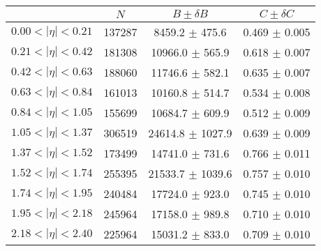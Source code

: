\begin{tabular}{lccc}
\hline
    &   $N$   & $B \pm \delta B$  &  $C \pm \delta C$ \\
\hline
$0.00 < |\eta| <0.21$          & 137287     & 8459.2     $\pm$ 475.6 & 0.469      $\pm$ 0.005 \\
$0.21 < |\eta| <0.42$          & 181308     & 10966.0    $\pm$ 565.9 & 0.618      $\pm$ 0.007 \\
$0.42 < |\eta| <0.63$          & 188060     & 11746.6    $\pm$ 582.1 & 0.635      $\pm$ 0.007 \\
$0.63 < |\eta| <0.84$          & 161013     & 10160.8    $\pm$ 514.7 & 0.534      $\pm$ 0.008 \\
$0.84 < |\eta| <1.05$          & 155699     & 10684.7    $\pm$ 609.9 & 0.512      $\pm$ 0.009 \\
$1.05 < |\eta| <1.37$          & 306519     & 24614.8    $\pm$ 1027.9 & 0.639      $\pm$ 0.009 \\
$1.37 < |\eta| <1.52$          & 173499     & 14741.0    $\pm$ 731.6 & 0.766      $\pm$ 0.011 \\
$1.52 < |\eta| <1.74$          & 255395     & 21533.7    $\pm$ 1039.6 & 0.757      $\pm$ 0.010 \\
$1.74 < |\eta| <1.95$          & 240484     & 17724.0    $\pm$ 923.0 & 0.745      $\pm$ 0.010 \\
$1.95 < |\eta| <2.18$          & 245964     & 17158.0    $\pm$ 989.8 & 0.710      $\pm$ 0.010 \\
$2.18 < |\eta| <2.40$          & 225964     & 15031.2    $\pm$ 833.0 & 0.709      $\pm$ 0.010 \\
\hline
\end{tabular}
